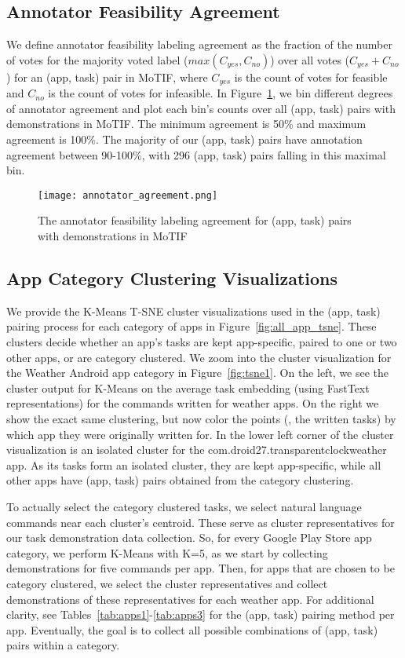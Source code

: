 \subsection{Annotator Feasibility Agreement}
\label{sec:agree}
We define annotator feasibility labeling agreement as the fraction of the number of votes for the majority voted label ($max(C_{yes}, C_{no})$) over all votes ($C_{yes} + C_{no}$) for an (app, task) pair in MoTIF, where $C_{yes}$ is the count of votes for feasible and $C_{no}$ is the count of votes for infeasible. In Figure~\ref{fig:agree}, we bin different degrees of annotator agreement and plot each bin's counts over all (app, task) pairs with demonstrations in MoTIF. The minimum agreement is 50\% and maximum agreement is 100\%. The majority of our (app, task) pairs have annotation agreement between 90-100\%, with 296 (app, task) pairs falling in this maximal bin.
\begin{figure}[t]
    \centering
    \texttt{[image: annotator\_agreement.png]}
    \caption{The annotator feasibility labeling agreement for (app, task) pairs with demonstrations in MoTIF}
    \label{fig:agree}
\end{figure}

\subsection{App Category Clustering Visualizations}
\label{sec:tsne}
We provide the K-Means T-SNE cluster visualizations used in the (app, task) pairing process for each category of apps in Figure~\ref{fig:all_app_tsne}. These clusters decide whether an app's tasks are kept app-specific, paired to one or two other apps, or are category clustered. We zoom into the cluster visualization for the Weather Android app category in Figure~\ref{fig:tsne1}. On the left, we see the cluster output for K-Means on the average task embedding (using FastText representations) for the commands written for weather apps. On the right we show the exact same clustering, but now color the points (\ie, the written tasks) by which app they were originally written for. In the lower left corner of the cluster visualization is an isolated cluster for the com.droid27.transparentclockweather app. As its tasks form an isolated cluster, they are kept app-specific, while all other apps have (app, task) pairs obtained from the category clustering. %

To actually select the category clustered tasks, we select natural language commands near each cluster's centroid. These serve as cluster representatives for our task demonstration data collection. So, for every Google Play Store app category, we perform K-Means with K=5, as we start by collecting demonstrations for five commands per app. Then, for apps that are chosen to be category clustered, we select the cluster representatives and collect demonstrations of these representatives for each weather app. For additional clarity, see Tables~\ref{tab:apps1}-\ref{tab:apps3} for the (app, task) pairing method per app. Eventually, the goal is to collect all possible combinations of (app, task) pairs within a category.

